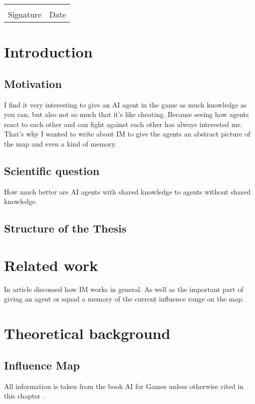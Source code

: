 \documentclass[]{report}
\begin{document}
\vfill
\noindent\begin{tabular}{ll}
	\makebox[2.5in]{\hrulefill} & \makebox[2.5in]{\hrulefill}\\
	Signature & Date\\[8ex]
\end{tabular}
\newpage

\newpage
\tableofcontents
\newpage
\chapter{Introduction}

\section{Motivation}
I find it very interesting to give an \ac{AI} agent in the game as much knowledge as you can, but also not so much that it's like cheating. Because seeing how agents react to each other and can fight against each other has always interested me. That's why I wanted to write about \ac{IM} to give the agents an abstract picture of the map and even a kind of memory.

\section{Scientific question}
How much better are \ac{AI} agents with shared knowledge to agents without shared knowledge.
\section{Structure of the Thesis}

\chapter{Related work}
In \citep{gameDevInfluenceMap} article discussed how \ac{IM} works in general. As well as the important part of giving an agent or squad a memory of the current influence range on the map. 

\chapter{Theoretical background}
\section{Influence Map}
All information is taken from the book \ac{AI} for Games unless otherwise cited in this chapter \citep{AIforGamesTactical}.
\end{document}

